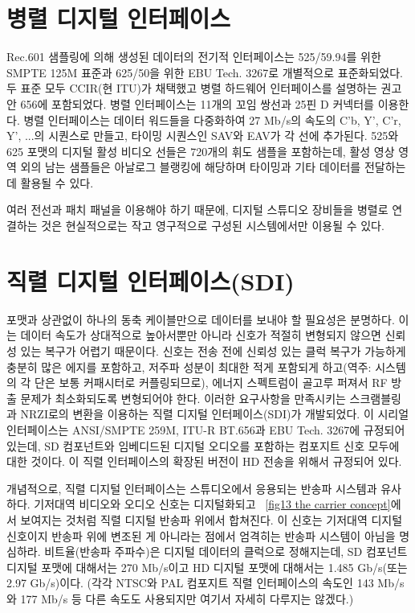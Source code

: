 \section{병렬 디지털 인터페이스}
Rec.601 샘플링에 의해 생성된 데이터의 전기적 인터페이스는 525/59.94를 위한 SMPTE 125M 표준과 625/50을 위한 EBU Tech. 3267로 개별적으로 표준화되었다. 두 표준 모두 CCIR(현 ITU)가 채택했고 병렬 하드웨어 인터페이스를 설명하는 권고안 656에 포함되었다.
병렬 인터페이스는 11개의 꼬임 쌍선과 25핀 D 커넥터를 이용한다. 병렬 인터페이스는 데이터 워드들을 다중화하여 27 Mb/s의 속도의 C'b, Y', C'r, Y', ...의 시퀀스로 만들고, 타이밍 시퀀스인 SAV와 EAV가 각 선에 추가된다.
525와 625 포맷의 디지털 활성 비디오 선들은 720개의 휘도 샘플을 포함하는데, 활성 영상 영역 외의 남는 샘플들은 아날로그 블랭킹에 해당하며 타이밍과 기타 데이터를 전달하는 데 활용될 수 있다.

여러 전선과 패치 패널을 이용해야 하기 때문에, 디지털 스튜디오 장비들을 병렬로 연결하는 것은 현실적으로는 작고 영구적으로 구성된 시스템에서만 이용될 수 있다.

\section{직렬 디지털 인터페이스(SDI)}
포맷과 상관없이 하나의 동축 케이블만으로 데이터를 보내야 할 필요성은 분명하다. 이는 데이터 속도가 상대적으로 높아서뿐만 아니라 신호가 적절히 변형되지 않으면 신뢰성 있는 복구가 어렵기 때문이다.
신호는 전송 전에 신뢰성 있는 클럭 복구가 가능하게 충분히 많은 에지를 포함하고, 저주파 성분이 최대한 적게 포함되게 하고(역주: 시스템의 각 단은 보통 커패시터로 커플링되므로), 에너지 스펙트럼이 골고루 퍼져서 RF 방출 문제가 최소화되도록 변형되어야 한다.
이러한 요구사항을 만족시키는 스크램블링과 NRZI로의 변환을 이용하는 직렬 디지털 인터페이스(SDI)가 개발되었다. 이 시리얼 인터페이스는 ANSI/SMPTE 259M, ITU-R BT.656과 EBU Tech. 3267에 규정되어 있는데, SD 컴포넌트와 임베디드된 디지털 오디오를 포함하는 컴포지트 신호 모두에 대한 것이다.
이 직렬 인터페이스의 확장된 버전이 HD 전송을 위해서 규정되어 있다.

개념적으로, 직렬 디지털 인터페이스는 스튜디오에서 응용되는 반송파 시스템과 유사하다. 기저대역 비디오와 오디오 신호는 디지털화되고 \figurename~\ref{fig13 the carrier concept}에서 보여지는 것처럼 직렬 디지털 반송파 위에서 합쳐진다.
이 신호는 기저대역 디지털 신호이지 반송파 위에 변조된 게 아니라는 점에서 엄격히는 반송파 시스템이 아님을 명심하라.
비트율(반송파 주파수)은 디지털 데이터의 클럭으로 정해지는데, SD 컴포넌트 디지털 포맷에 대해서는 270 Mb/s이고 HD 디지털 포맷에 대해서는 1.485 Gb/s(또는 2.97 Gb/s)이다. (각각 NTSC와 PAL 컴포지트 직렬 인터페이스의 속도인 143 Mb/s와 177 Mb/s 등 다른 속도도 사용되지만 여기서 자세히 다루지는 않겠다.)

